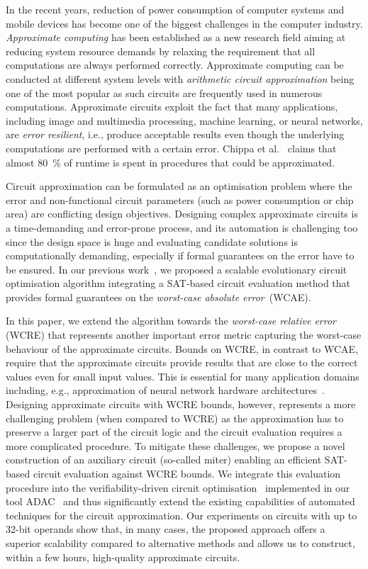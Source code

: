 \documentclass[runningheads]{llncs}
\begin{document}
In the recent years, reduction of power consumption of computer systems and
mobile devices has become one of the biggest challenges in the computer
industry. \emph{Approximate computing} has been established as a new research
field aiming at reducing system resource demands by relaxing the requirement
that all computations are always performed correctly. Approximate computing can
be conducted at different system levels with \emph{arithmetic circuit
approximation} being one of the most popular as such circuits are frequently
used in numerous computations. Approximate circuits exploit the fact that many
applications, including image and multimedia processing, machine learning, or
neural networks, are \emph{error resilient}, i.e., produce acceptable results
even though the underlying computations are performed with a certain error.
Chippa et al.~\cite{Chippa:dac2013} claims that almost 80\ \% of runtime is
spent in procedures that could be approximated.

Circuit approximation can be formulated as an optimisation problem where the
error and non-functional circuit parameters (such as power consumption or chip
area) are conflicting design objectives. Designing complex approximate circuits
is a time-demanding and error-prone process, and its automation is challenging
too since the design space is huge and evaluating  candidate solutions is
computationally demanding, especially if formal guarantees on the error have to
be ensured. In our previous work~\cite{iccad17}, we proposed a scalable
evolutionary circuit optimisation algorithm integrating a SAT-based circuit
evaluation method that provides formal guarantees on the \emph{worst-case
absolute error}~(WCAE).

In this paper, we extend the algorithm towards the \emph{worst-case relative
error} (WCRE) that represents another important error metric capturing the
worst-case behaviour of the approximate circuits. Bounds on WCRE, in contrast to
WCAE, require that the approximate circuits provide results that are close to
the correct values even for small input values. This is essential for many
application domains including, e.g., approximation of neural network hardware
architectures~\cite{Judd:2016}. Designing approximate circuits with WCRE bounds,
however, represents a more challenging problem (when compared to WCRE) as the
approximation has to preserve a larger part of the circuit logic and the circuit
evaluation requires a more complicated procedure. To mitigate these challenges,
we propose a novel construction of an auxiliary circuit (so-called miter)
enabling an efficient SAT-based circuit evaluation against WCRE bounds. We
integrate this evaluation procedure into the verifiability-driven circuit
optimisation~\cite{iccad17} implemented in our tool ADAC~\cite{ADAC} and thus
significantly extend the existing capabilities  of automated techniques for the
circuit approximation. Our experiments on  circuits with up to 32-bit operands
show that, in many cases, the proposed approach offers a superior scalability
compared to alternative methods and allows us to construct, within a few hours,
high-quality approximate circuits.
\end{document}
